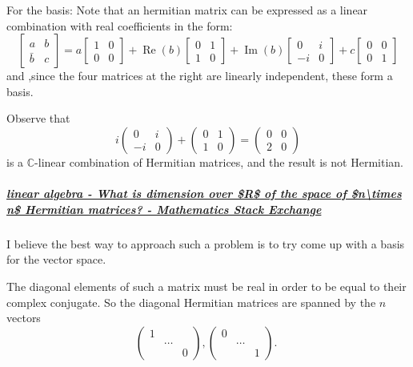 For the basis: Note that an hermitian matrix can be expressed as a linear combination with real coefficients in the form:
$$
\left[\begin{array}{ll}
a & b \\
\bar{b} & c
\end{array}\right]=a\left[\begin{array}{ll}
1 & 0 \\
0 & 0
\end{array}\right]+\operatorname{Re}(b)\left[\begin{array}{ll}
0 & 1 \\
1 & 0
\end{array}\right]+\operatorname{Im}(b)\left[\begin{array}{cc}
0 & i \\
-i & 0
\end{array}\right]+c\left[\begin{array}{ll}
0 & 0 \\
0 & 1
\end{array}\right]
$$
and ,since the four matrices at the right are linearly independent, these form a basis. 

\begin{example}
    Observe that
$$
i\left(\begin{array}{cc}
0 & i \\
-i & 0
\end{array}\right)+\left(\begin{array}{cc}
0 & 1 \\
1 & 0
\end{array}\right)=\left(\begin{array}{cc}
0 & 0 \\
2 & 0
\end{array}\right)
$$
is a $\mathbb{C}$-linear combination of Hermitian matrices, and the result is not Hermitian.
\end{example}


\subparagraph{\href{https://math.stackexchange.com/questions/2840794/what-is-dimension-over-mathbb-r-of-the-space-of-n-times-n-hermitian-matrice}{linear algebra - What is dimension over \$\mathbb R\$ of the space of \$n\textbackslash{}times n\$ Hermitian matrices? - Mathematics Stack Exchange} 
}
I believe the best way to approach such a problem is to try come up with a basis for the vector space.

The diagonal elements of such a matrix must be real in order to be equal to their complex conjugate. So the diagonal Hermitian matrices are spanned by the $n$ vectors
$$
\left(\begin{array}{lll}
1 & & \\
& \ldots & \\
& & 0
\end{array}\right),\left(\begin{array}{ccc}
0 & & \\
& \ldots & \\
& & 1
\end{array}\right) \text {. }
$$


